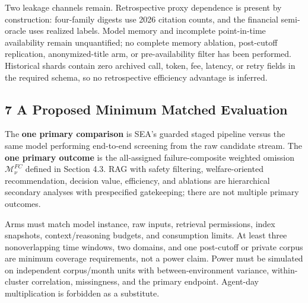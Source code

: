 \documentclass[
  11pt]{article}
\begin{document}
Two leakage channels remain. Retrospective proxy dependence is present
by construction: four-family digests use 2026 citation counts, and the
financial semi-oracle uses realized labels. Model memory and incomplete
point-in-time availability remain unquantified; no complete memory
ablation, post-cutoff replication, anonymized-title arm, or
pre-availability filter has been performed. Historical shards contain
zero archived call, token, fee, latency, or retry fields in the required
schema, so no retrospective efficiency advantage is inferred.

\subsection{7 A Proposed Minimum Matched
Evaluation}\label{a-proposed-minimum-matched-evaluation}

The \textbf{one primary comparison} is SEA's guarded staged pipeline
versus the same model performing end-to-end screening from the raw
candidate stream. The \textbf{one primary outcome} is the all-assigned
failure-composite weighted omission \(\mathcal M^{FC}_{\nu}\) defined in
Section 4.3. RAG with safety filtering, welfare-oriented recommendation,
decision value, efficiency, and ablations are hierarchical secondary
analyses with prespecified gatekeeping; there are not multiple primary
outcomes.

Arms must match model instance, raw inputs, retrieval permissions, index
snapshots, context/reasoning budgets, and consumption limits. At least
three nonoverlapping time windows, two domains, and one post-cutoff or
private corpus are minimum coverage requirements, not a power claim.
Power must be simulated on independent corpus/month units with
between-environment variance, within-cluster correlation, missingness,
and the primary endpoint. Agent-day multiplication is forbidden as a
substitute.
\end{document}
